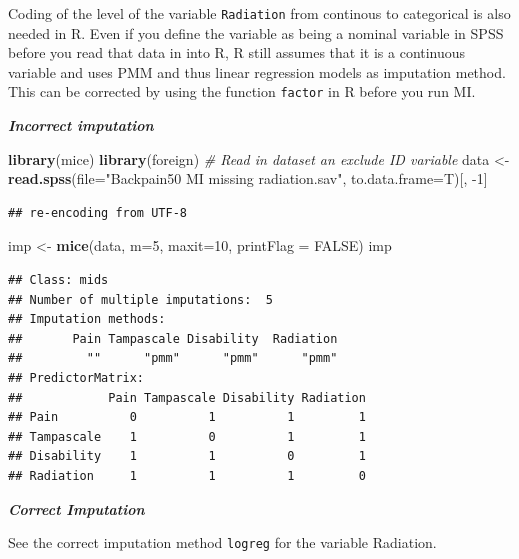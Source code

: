 \documentclass[
]{book}
\newenvironment{Shaded}{\begin{snugshade}}{\end{snugshade}}
\newcommand{\CommentTok}[1]{\textcolor[rgb]{0.56,0.35,0.01}{\textit{#1}}}
\newcommand{\DataTypeTok}[1]{\textcolor[rgb]{0.13,0.29,0.53}{#1}}
\newcommand{\DecValTok}[1]{\textcolor[rgb]{0.00,0.00,0.81}{#1}}
\newcommand{\KeywordTok}[1]{\textcolor[rgb]{0.13,0.29,0.53}{\textbf{#1}}}
\newcommand{\NormalTok}[1]{#1}
\newcommand{\OtherTok}[1]{\textcolor[rgb]{0.56,0.35,0.01}{#1}}
\newcommand{\StringTok}[1]{\textcolor[rgb]{0.31,0.60,0.02}{#1}}
\begin{document}
Coding of the level of the variable \texttt{Radiation} from continous to
categorical is also needed in R. Even if you define the variable as
being a nominal variable in SPSS before you read that data in into R, R
still assumes that it is a continuous variable and uses PMM and thus
linear regression models as imputation method. This can be corrected by
using the function \texttt{factor} in R before you run MI.

\textbf{\emph{Incorrect imputation}}

\begin{Shaded}
\begin{Highlighting}[]
\KeywordTok{library}\NormalTok{(mice)}
\KeywordTok{library}\NormalTok{(foreign)}
\CommentTok{# Read in dataset an exclude ID variable}
\NormalTok{data <-}\StringTok{ }\KeywordTok{read.spss}\NormalTok{(}\DataTypeTok{file=}\StringTok{"Backpain50 MI missing radiation.sav"}\NormalTok{, }\DataTypeTok{to.data.frame=}\NormalTok{T)[, }\DecValTok{-1}\NormalTok{] }
\end{Highlighting}
\end{Shaded}

\begin{verbatim}
## re-encoding from UTF-8
\end{verbatim}

\begin{Shaded}
\begin{Highlighting}[]
\NormalTok{imp <-}\StringTok{ }\KeywordTok{mice}\NormalTok{(data, }\DataTypeTok{m=}\DecValTok{5}\NormalTok{, }\DataTypeTok{maxit=}\DecValTok{10}\NormalTok{, }\DataTypeTok{printFlag =} \OtherTok{FALSE}\NormalTok{)}
\NormalTok{imp}
\end{Highlighting}
\end{Shaded}

\begin{verbatim}
## Class: mids
## Number of multiple imputations:  5 
## Imputation methods:
##       Pain Tampascale Disability  Radiation 
##         ""      "pmm"      "pmm"      "pmm" 
## PredictorMatrix:
##            Pain Tampascale Disability Radiation
## Pain          0          1          1         1
## Tampascale    1          0          1         1
## Disability    1          1          0         1
## Radiation     1          1          1         0
\end{verbatim}

\textbf{\emph{Correct Imputation}}

See the correct imputation method \texttt{logreg} for the variable
Radiation.
\end{document}
